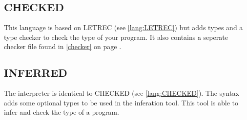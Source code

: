 \documentclass[../codeprint.tex]{subfiles}
\begin{document}
\subsection{CHECKED}
\label{lang:CHECKED}
This language is based on LETREC (see \autoref{lang:LETREC}) but adds types and a type checker to check the type of your program.
It also contains a seperate checker file found in \autoref{checker} on page \pageref{checker}.




\subsection{INFERRED}
The interpreter is identical to CHECKED (see \autoref{lang:CHECKED}). The syntax adds some optional types to be used in the inferation tool. This tool is able to infer and check the type of a program.


\end{document}
